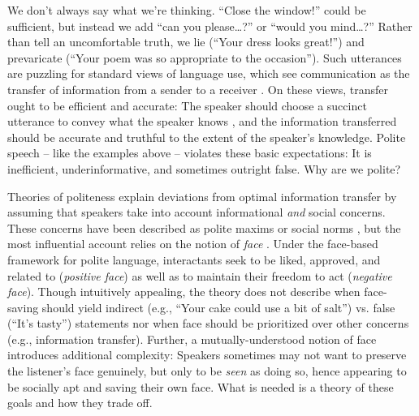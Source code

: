 \documentclass[12pt]{article}
\begin{document}
We don't always say what we're thinking. \enquote{Close the
window!} could be sufficient, but instead we add \enquote{can you please\ldots{}?}
or \enquote{would you mind\ldots{}?}
Rather than tell an
uncomfortable truth, we lie (\enquote{Your dress looks great!}) and
prevaricate (\enquote{Your poem was so appropriate to the occasion}).
Such utterances are puzzling for standard views of language use, which
see communication as the transfer of information from a sender to a
receiver \cite{buhler1934, shannon1948, jakobson1960, frank2012}. On these views, transfer ought to be efficient and
accurate: The speaker should choose a succinct utterance  to convey
what the speaker knows \cite{grice1975, searle1975},
and the information transferred should be accurate and truthful
to the extent of the speaker's knowledge. Polite speech --
like the examples above -- violates these basic expectations: It is inefficient,
underinformative, and sometimes outright false. Why are we
polite?

Theories of politeness explain deviations from optimal information
transfer by assuming that speakers take into account informational \emph{and} social concerns.
These concerns have been described as polite maxims \cite{leech1983} or social norms \cite{ide1989},
but the most influential account relies on the notion of \emph{face} \cite{brown1987, goffman1967}.
Under the face-based framework for polite language, interactants seek to be liked,
approved, and related to (\emph{positive face}) as well as to maintain
their freedom to act (\emph{negative face}).
Though intuitively appealing, the theory does not describe when face-saving should yield indirect (e.g., \enquote{Your cake could use a bit of salt}) vs. false (\enquote{It's tasty}) statements nor when face should be prioritized over other concerns (e.g., information transfer).
Further, a mutually-understood notion of face introduces additional complexity: Speakers sometimes may not want to preserve the listener's face genuinely, but only to be \emph{seen} as doing so, hence appearing to be socially apt and saving their own face.
What is needed is a theory of these goals and how they trade off.

\end{document}
